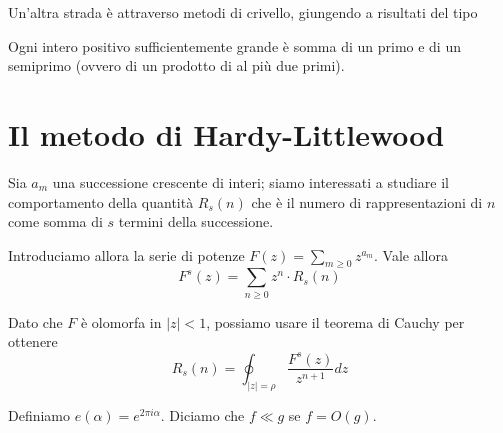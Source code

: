Un'altra strada è attraverso metodi di crivello, giungendo a risultati del tipo
\begin{theorem}[Chen, 1973]
    Ogni intero positivo sufficientemente grande è somma di un primo e di un semiprimo (ovvero di un prodotto di al più due primi).
\end{theorem}


\section{Il metodo di Hardy-Littlewood}
Sia $a_m$ una successione crescente di interi; siamo interessati a studiare il comportamento della quantità $R_s(n)$ che è il numero di rappresentazioni di $n$ come somma di $s$ termini della successione.

Introduciamo allora la serie di potenze $F(z)=\sum_{m\ge0} z^{a_m}$. Vale allora
$$ F^s(z)=\sum_{n\ge0}z^n\cdot R_s(n)$$

Dato che $F$ è olomorfa in $|z|<1$, possiamo usare il teorema di Cauchy per ottenere
$$ R_s(n)=\oint_{|z|=\rho}\frac{F^s(z)}{z^{n+1}}dz$$

\begin{notazione}
    Definiamo $e(\alpha)=e^{2\pi i\alpha}$. Diciamo che $f\ll g$ se $f=O(g)$.
\end{notazione}
